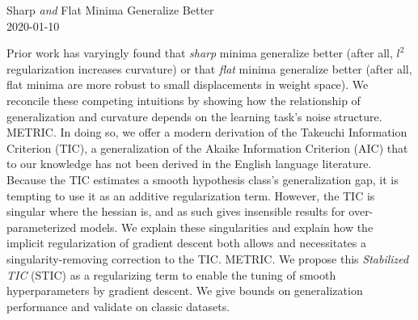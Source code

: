 \documentclass{article}
\begin{document}
    \begin{center}
        \Large
        Sharp \emph{and} Flat Minima Generalize Better
        \\
        \large
        2020-01-10
    \end{center}

    Prior work has varyingly found that \emph{sharp} minima generalize better
    (after all, $l^2$ regularization increases curvature) or that \emph{flat}
    minima generalize better (after all, flat minima are more robust to small
    displacements in weight space).  We reconcile these competing intuitions by
    showing how the relationship of generalization and curvature depends on the
    learning task's noise structure.  METRIC.  In doing so, we offer a modern
    derivation of the Takeuchi Information Criterion (TIC), a generalization of
    the Akaike Information Criterion (AIC) that to our knowledge has not been
    derived in the English language literature.  Because the TIC estimates a
    smooth hypothesis class's generalization gap, it is tempting to use it as an
    additive regularization term.  However, the TIC is singular where the
    hessian is, and as such gives insensible results for over-parameterized
    models.  We explain these singularities and explain how the implicit
    regularization of gradient descent both allows and necessitates a
    singularity-removing correction to the TIC.  METRIC.  We propose this
    \emph{Stabilized TIC} (STIC) as a regularizing term to enable the tuning of
    smooth hyperparameters by gradient descent.  We give bounds on
    generalization performance and validate on classic datasets.  
\end{document}
